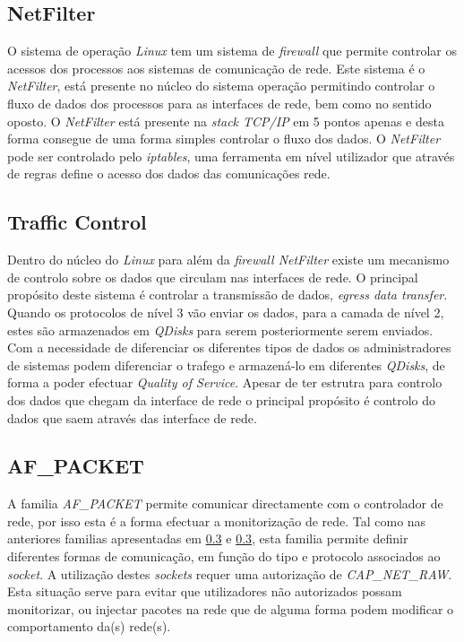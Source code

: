 \subsection{NetFilter}

O sistema de operação \textit{Linux} tem um sistema de \textit{firewall} que permite controlar os acessos dos processos aos sistemas de comunicação de rede.
 Este sistema é o \textit{NetFilter}, está presente no núcleo do sistema operação permitindo controlar o fluxo de dados dos processos para as interfaces de rede, bem como no sentido oposto.
 O \textit{NetFilter} está presente na \textit{stack TCP/IP} em 5 pontos apenas e desta forma consegue de uma forma simples controlar o fluxo dos dados.
 O \textit{NetFilter} pode ser controlado pelo \textit{iptables}, uma ferramenta em nível utilizador que através de regras define o acesso dos dados das comunicações rede.

\subsection{Traffic Control}
 Dentro do núcleo do \textit{Linux} para além da \textit{firewall NetFilter} existe um mecanismo de controlo sobre os dados que circulam nas interfaces de rede.
 O principal propósito deste sistema é controlar a transmissão de dados, \textit{egress data transfer}.
 Quando os protocolos de nível 3 vão enviar os dados, para a camada de nível 2, estes são armazenados em \textit{QDisks} para serem posteriormente serem enviados.
 Com a necessidade de diferenciar os diferentes tipos de dados os administradores de sistemas podem diferenciar o trafego e armazená-lo em diferentes \textit{QDisks}, de forma a poder efectuar \textit{Quality of Service}.
Apesar de ter estrutra para controlo dos dados que chegam da interface de rede o principal propósito é controlo do dados que saem através das interface de rede.

\subsection{AF\_PACKET}

A familia \textit{AF\_PACKET} permite comunicar directamente com o controlador de rede, por isso esta é a forma efectuar a monitorização de rede. 
 Tal como nas anteriores familias apresentadas em \ref{} e \ref{}, esta familia permite definir diferentes formas de comunicação, em função do tipo e protocolo associados ao \textit{socket}.
 A utilização destes \textit{sockets} requer uma autorização de \textit{CAP\_NET\_RAW}.
 Esta situação serve para evitar que utilizadores não autorizados possam monitorizar, ou injectar pacotes na rede que de alguma forma podem modificar o comportamento da(s) rede(s).

